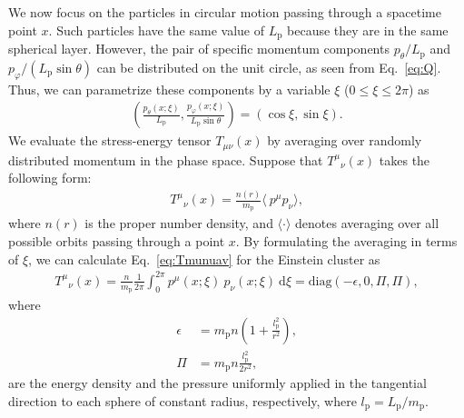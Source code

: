 \documentclass[aps,11pt,nofootinbib,preprintnumbers,groupedaddress,superscriptaddress]{revtex4-2}
\begin{document}
We now focus on the particles in circular motion passing through a spacetime point $x$. 
Such particles have the same value of 
$L_{\mathrm{p}}$
because they are in the same spherical layer. However, 
the pair of specific momentum components 
$p_{\theta}/L_{\mathrm{p}}$ and $p_\varphi/(L_{\mathrm{p}}\sin\theta)$
can be
distributed on the unit circle, as seen from Eq.~\eqref{eq:Q}.
Thus, we can parametrize these components by a variable $\xi$ ($0\le \xi \le 2\pi$) as
\begin{align}
\left(\frac{p_\theta(x; \xi)}{L_{\mathrm{p}}}, \frac{p_\varphi(x; \xi)}{L_{\mathrm{p}} \sin \theta }\right)
=(\cos \xi, \sin \xi).
\end{align}
We evaluate the stress-energy tensor $T_{\mu\nu}(x)$ by averaging over randomly distributed momentum in the phase space. Suppose that $T^{\mu}{}_{\nu}(x)$ takes the following form:
\begin{align}
\label{eq:Tmunuav}
T^\mu{}_{\nu}(x)=\frac{n(r)}{m_{\mathrm{p}}} \langle \:\!p^\mu p_\nu \rangle,
\end{align}
where $n(r)$ is the proper number density, and $\langle\cdot \rangle$ denotes averaging over all possible orbits passing through a point $x$. By formulating the averaging in terms of $\xi$, we can calculate Eq.~\eqref{eq:Tmunuav} for the Einstein cluster as
\begin{align}
T^\mu{}_{\nu}(x)=\frac{n}{m_{\mathrm{p}}}\frac{1}{2\pi} \int_0^{2\pi} p^\mu(x; \xi) \:\!p_\nu(x; \xi)\:\! \mathrm{d} \xi 
=\mathrm{diag} (-\epsilon, 0, \Pi, \Pi),
\end{align}
where 
\begin{align}
\epsilon&= m_{\mathrm{p}} n \left(1+
\frac{l_{\mathrm{p}}^2}{r^2}
\right),
\\
\Pi&=m_{\mathrm{p}} n 
\frac{l_{\mathrm{p}}^2}{2r^2},
\end{align}
are the energy density and the pressure uniformly applied in the tangential direction to each sphere of constant radius, respectively, where $l_{\mathrm{p}}=L_{\mathrm{p}}/m_{\mathrm{p}}$.


\end{document}

